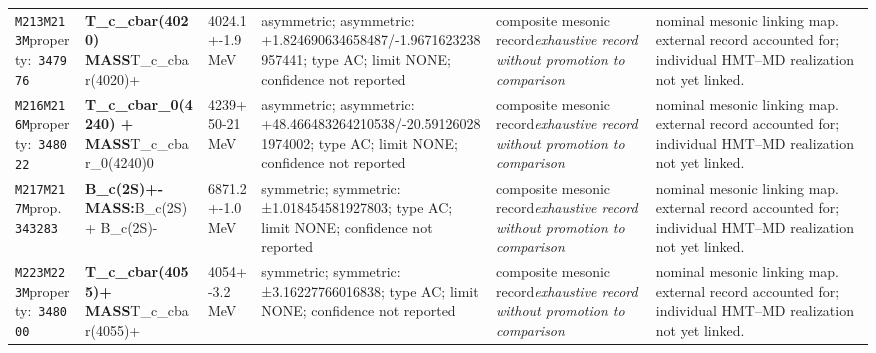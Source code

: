 \begin{landscape}
\begin{longtable}{L{1.85cm}L{4.45cm}L{2.35cm}L{4.05cm}L{3.35cm}L{7.15cm}}
\texttt{M213}\newline \texttt{M213M}\newline property:\ \texttt{347976} & \textbf{T\_\allowbreak{}c\_\allowbreak{}cbar(4020) MASS}\newline T\_\allowbreak{}c\_\allowbreak{}cbar(4020)+ & 4024.1+-1.9\,MeV & asymmetric; asymmetric: +1.824690634658487/-1.9671623238957441; type AC; limit NONE; confidence not reported & composite mesonic record\newline \emph{exhaustive record without promotion to comparison} & nominal mesonic linking map. external record accounted for; individual HMT--MD realization not yet linked. \\
\texttt{M216}\newline \texttt{M216M}\newline property:\ \texttt{348022} & \textbf{T\_\allowbreak{}c\_\allowbreak{}cbar\_\allowbreak{}0(4240) + MASS}\newline T\_\allowbreak{}c\_\allowbreak{}cbar\_\allowbreak{}0(4240)0 & 4239+50-21\,MeV & asymmetric; asymmetric: +48.466483264210538/-20.591260281974002; type AC; limit NONE; confidence not reported & composite mesonic record\newline \emph{exhaustive record without promotion to comparison} & nominal mesonic linking map. external record accounted for; individual HMT--MD realization not yet linked. \\
\texttt{M217}\newline \texttt{M217M}\newline prop.\ \texttt{343283} & \textbf{B\_\allowbreak{}c(2S)+- MASS:}\newline B\_\allowbreak{}c(2S)+ \textbar{}\allowbreak{} B\_\allowbreak{}c(2S)- & 6871.2+-1.0\,MeV & symmetric; symmetric: ±1.018454581927803; type AC; limit NONE; confidence not reported & composite mesonic record\newline \emph{exhaustive record without promotion to comparison} & nominal mesonic linking map. external record accounted for; individual HMT--MD realization not yet linked. \\
\texttt{M223}\newline \texttt{M223M}\newline property:\ \texttt{348000} & \textbf{T\_\allowbreak{}c\_\allowbreak{}cbar(4055)+ MASS}\newline T\_\allowbreak{}c\_\allowbreak{}cbar(4055)+ & 4054+-3.2\,MeV & symmetric; symmetric: ±3.16227766016838; type AC; limit NONE; confidence not reported & composite mesonic record\newline \emph{exhaustive record without promotion to comparison} & nominal mesonic linking map. external record accounted for; individual HMT--MD realization not yet linked. \\

\end{longtable}
\end{landscape}
